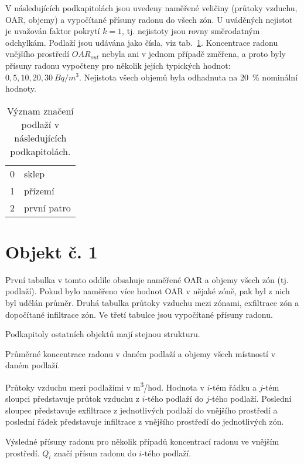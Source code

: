 V následujících podkapitolách jsou uvedeny naměřené veličiny (průtoky vzduchu, OAR, objemy) a vypočítané přísuny radonu do všech zón. U uváděných nejistot je uvažován faktor pokrytí $k=1$, tj. nejistoty jsou rovny směrodatným odchylkám. Podlaží jsou udávána jako čísla, viz tab.~\ref{tab:rovMer_podlazi}. Koncentrace radonu vnějšího prostředí $OAR_{out}$ nebyla ani v jednom případě změřena, a proto byly přísuny radonu vypočteny pro několik jejích typických hodnot: $0, 5, 10, 20, 30\ \si{Bq/m^3}$. Nejistota všech objemů byla odhadnuta na 20~\% nominální hodnoty.
\begin{table}[ht]
	\centering
	\caption{Význam značení podlaží v následujících podkapitolách.}
	\label{tab:rovMer_podlazi}
	\begin{tabular}{ll}
		\toprule
		0&sklep\\
		1&přízemí\\
		2&první patro\\
		\bottomrule
	\end{tabular}
\end{table}

\section{Objekt č. 1}
První tabulka v tomto oddíle obsahuje naměřené OAR a objemy všech zón (tj. podlaží). Pokud bylo naměřeno více hodnot OAR v nějaké zóně, pak byl z nich byl udělán průměr. Druhá tabulka průtoky vzduchu mezi zónami, exfiltrace zón a dopočítané infiltrace zón. Ve třetí tabulce jsou vypočítané přísuny radonu. 

Podkapitoly ostatních objektů mají stejnou strukturu.
\begin{table}[H]
	\centering
	\caption{Průměrné koncentrace radonu v daném podlaží a objemy všech místností v daném podlaží.}
	
\end{table}
\begin{table}[H]
	\centering
	\caption{Průtoky vzduchu mezi podlažími v \si{m^3/hod}. Hodnota v $i$-tém řádku a $j$-tém sloupci představuje průtok vzduchu z $i$-tého podlaží do $j$-tého podlaží. Poslední sloupec představuje exfiltrace z jednotlivých podlaží do vnějšího prostředí a poslední řádek představuje infiltrace z vnějšího prostředí do jednotlivých zón.}
	
\end{table}
\begin{table}[H]
	\centering
	\caption{Výsledné přísuny radonu pro několik případů koncentrací radonu ve vnějším prostředí. $Q_i$ značí přísun radonu do $i$-tého podlaží.}
    \label{tab:rovMer_Q_1}
	
\end{table}

